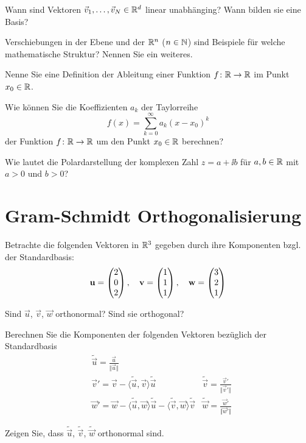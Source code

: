 \documentclass{scrartcl}
\newcommand{\vv}{\vec{v}}
\newcommand{\uu}{\vec{u}}
\newcommand{\ww}{\vec{w}}
\newcommand{\UU}{\mat{u}}
\newcommand{\VV}{\mat{v}}
\newcommand{\WW}{\mat{w}}
\begin{document}
\begin{subex}
  \item{} Wann sind Vektoren $\vv_1,\ldots,\vv_N \in \RR^d$ linear unabhänging? Wann bilden sie eine Basis?
  \item{} Verschiebungen in der Ebene und der $\mathbb{R}^n$ ($n \in \mathbb{N}$) sind Beispiele für welche mathematische Struktur? Nennen Sie ein weiteres.
  \item{} Nenne Sie eine Definition der Ableitung einer Funktion $f\colon \mathbb{R} \to \mathbb{R}$ im Punkt $x_0 \in \mathbb{R}$.
  \item{} Wie können Sie die Koeffizienten $a_k$ der Taylorreihe
  \[
    f(x) = \sum_{k=0}^\infty a_k (x - x_0)^k
  \]
  der Funktion $f\colon \mathbb{R} \to \mathbb{R}$ um den Punkt $x_0 \in \mathbb{R}$ berechnen?
  \item{} Wie lautet die Polardarstellung der komplexen Zahl $z = a + \ii b$ für $a, b \in \mathbb{R}$ mit $a > 0$ und $b > 0$?
\end{subex}


\section{Gram-Schmidt Orthogonalisierung }
\label{sec:gram_schmidt_orthogonalisierung}

Betrachte die folgenden Vektoren in $\mathbb{R}^3$ gegeben durch ihre Komponenten bzgl. der Standardbasis:
\[
  \UU = \colvec{2 \\ 0 \\ 2}, \quad \VV = \colvec{1 \\ 1 \\ 1}, \quad{\WW} = \colvec{3 \\ 2 \\ 1}
\]

\begin{subex}
  \item{} Sind $\uu$, $\vv$, $\ww$ orthonormal? Sind sie orthogonal?
  \item{} Berechnen Sie die Komponenten der folgenden Vektoren bezüglich der Standardbasis
  \begin{align*}
    &\tilde\uu = \frac{\uu}{\Vert \uu \Vert} & \\
    &\vv' = \vv - \langle \tilde \uu, \vv \rangle \tilde\uu 
    &\tilde\vv = \frac{\vv'}{\Vert \vv' \Vert} \\
    &\ww' = \ww - \langle \tilde \uu, \ww \rangle \tilde\uu - \langle \tilde \vv, \ww \rangle \tilde\vv 
    &\tilde\ww = \frac{\ww'}{\Vert \ww' \Vert}
  \end{align*}
  \item{} Zeigen Sie, dass $\tilde\uu$, $\tilde\vv$, $\tilde\ww$ orthonormal sind.
\end{subex}
\end{document}
